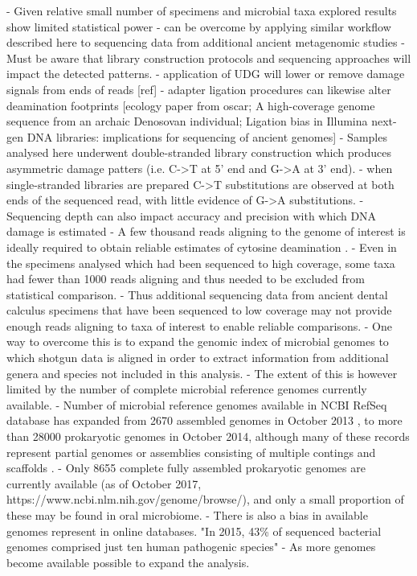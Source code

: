 \documentclass[12pt, a4paper]{article}
\begin{document}
- Given relative small number of specimens and microbial taxa explored results show limited statistical power 
- can be overcome by applying similar workflow described here to sequencing data from additional ancient metagenomic studies
- Must be aware that library construction protocols and sequencing approaches will impact the detected patterns.
- application of UDG will lower or remove damage signals from ends of reads [ref]
- adapter ligation procedures can likewise alter deamination footprints [ecology paper from oscar; A high-coverage genome sequence from an archaic Denosovan individual; Ligation bias in Illumina next-gen DNA libraries: implications for sequencing of ancient genomes]
- Samples analysed here underwent double-stranded library construction which produces asymmetric damage patters (i.e. C->T at 5' end and G->A at 3' end).
- when single-stranded libraries are prepared C->T substitutions are observed at both ends of the sequenced read, with little evidence of G->A substitutions.
- Sequencing depth can also impact accuracy and precision with which DNA damage is estimated
- A few thousand reads aligning to the genome of interest is ideally required to obtain reliable estimates of cytosine deamination \cite{Warinner:2017aa}. 
- Even in the specimens analysed which had been sequenced to high coverage, some taxa had fewer than 1000 reads aligning and thus needed to be excluded from statistical comparison. 
- Thus additional sequencing data from ancient dental calculus specimens that have been sequenced to low coverage may not provide enough reads aligning to taxa of interest to enable reliable comparisons.
- One way to overcome this is to expand the genomic index of microbial genomes to which shotgun data is aligned in order to extract information from additional genera and species not included in this analysis.
- The extent of this is however limited by the number of complete microbial reference genomes currently available. 
- Number of microbial reference genomes available in NCBI RefSeq database has expanded from 2670 assembled genomes in October 2013 \cite{Tatusova:2015aa}, to more than 28000 prokaryotic genomes in October 2014, although many of these records represent partial genomes or assemblies consisting of multiple contings and scaffolds \cite{Tatusova:2015ab}.
- Only 8655 complete fully assembled prokaryotic genomes are currently available (as of October 2017, https://www.ncbi.nlm.nih.gov/genome/browse/), and only a small proportion of these may be found in oral microbiome. 
- There is also a bias in available genomes represent in online databases. 
"In 2015, 43\% of sequenced bacterial genomes comprised just ten human pathogenic species" \cite{Mukherjee:2017aa}
- As more genomes become available possible to expand the analysis.
\end{document}
